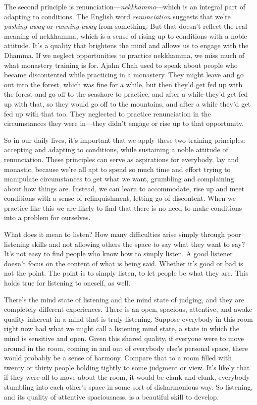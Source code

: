 The second principle is renunciation---\emph{nekkhamma}---which is an 
integral part of adapting to conditions. The English word 
\emph{renunciation} suggests that we're \emph{pushing away} or 
\emph{running away} from something. But that doesn't reflect the real 
meaning of nekkhamma, which is a sense of rising up to conditions with 
a noble attitude. It's a quality that brightens the mind and allows us 
to engage with the Dhamma. If we neglect opportunities to practice 
nekkhamma, we miss much of what monastery training is for. Ajahn Chah 
used to speak about people who became discontented while practicing in 
a monastery. They might leave and go out into the forest, which was 
fine for a while, but then they'd get fed up with the forest and go off 
to the seashore to practice, and after a while they'd get fed up with 
that, so they would go off to the mountains, and after a while they'd 
get fed up with that too. They neglected to practice renunciation in 
the circumstances they were in---they didn't engage or rise up to that 
opportunity.

So in our daily lives, it's important that we apply these two training 
principles: accepting and adapting to conditions, while sustaining a 
noble attitude of renunciation. These principles can serve as 
aspirations for everybody, lay and monastic, because we're all apt to 
spend so much time and effort trying to manipulate circumstances to get 
what we want, grumbling and complaining about how things are. Instead, 
we can learn to accommodate, rise up and meet conditions with a sense 
of relinquishment, letting go of discontent. When we practice like this 
we are likely to find that there is no need to make conditions into a 
problem for ourselves.


What does it mean to listen? How many difficulties arise simply through 
poor listening skills and not allowing others the space to say what 
they want to say? It's not easy to find people who know how to simply 
listen. A good listener doesn't focus on the content of what is being 
said. Whether it's good or bad is not the point. The point is to simply 
listen, to let people be what they are. This holds true for listening 
to oneself, as well.

There's the mind state of listening and the mind state of judging, and 
they are completely different experiences. There is an open, spacious, 
attentive, and awake quality inherent in a mind that is truly 
listening. Suppose everybody in this room right now had what we might 
call a listening mind state, a state in which the mind is sensitive and 
open. Given this shared quality, if everyone were to move around in the 
room, coming in and out of everybody else's personal space, there would 
probably be a sense of harmony. Compare that to a room filled with 
twenty or thirty people holding tightly to some judgment or view. It's 
likely that if they were all to move about the room, it would be 
clank-and-clunk, everybody stumbling into each other's space in some 
sort of disharmonious way. So listening, and its quality of attentive 
spaciousness, is a beautiful skill to develop.

